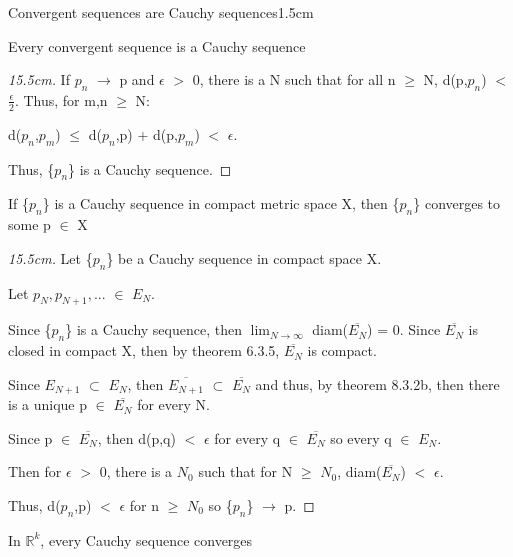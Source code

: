     \begin{ltheorem}{Convergent sequences are Cauchy sequences}{1.5cm}
        \item Every convergent sequence is a Cauchy sequence

            \begin{proof}[15.5cm]
                If $p_n$ $\rightarrow$ p and $\epsilon$ $>$ 0, there is a
                N such that for all n $\geq$ N, d(p,$p_n$) $<$ $\frac{\epsilon}{2}$.
                Thus, for m,n $\geq$ N:

				\hspace{0.5cm}
				d($p_n$,$p_m$) $\leq$ d($p_n$,p) + d(p,$p_m$) $<$ $\epsilon$.

				Thus, \{$p_n$\} is a Cauchy sequence.                
            \end{proof}

        \item If \{$p_n$\} is a Cauchy sequence in compact metric space X,
            then \{$p_n$\} converges to some p $\in$ X

            \begin{proof}[15.5cm]
                Let \{$p_n$\} be a Cauchy sequence in compact space X.

				Let	$p_N, p_{N+1}, ... $ $\in$ $E_N$.

				Since \{$p_n$\} is a Cauchy sequence, then
				$\lim_{N \rightarrow \infty}$ diam($\overline{E_N}$) = 0.
				Since $\overline{E_N}$ is closed in compact X, then
				by {\color{red} theorem 6.3.5}, $\overline{E_N}$ is compact.

				Since $E_{N+1}$ $\subset$ $E_N$, then $\overline{E_{N+1}}$
				$\subset$ $\overline{E_N}$ and thus, by
                {\color{red} theorem 8.3.2b},
				then there is a unique p $\in$ $\overline{E_N}$ for every N.

				Since p $\in$ $\overline{E_N}$, then d(p,q) $<$ $\epsilon$ for
                every q $\in$ $\overline{E_N}$ so every q $\in$ $E_N$.

                Then for $\epsilon$ $>$ 0, there is a $N_0$ such that
                for N $\geq$ $N_0$, diam($\overline{E_N}$) $<$ $\epsilon$.

				Thus, d($p_n$,p) $<$ $\epsilon$ for n $\geq$ $N_0$ so
                \{$p_n$\} $\rightarrow$ p.
            \end{proof}

        \item In $\mathbb{R}^k$, every Cauchy sequence converges
        

\end{ltheorem}
